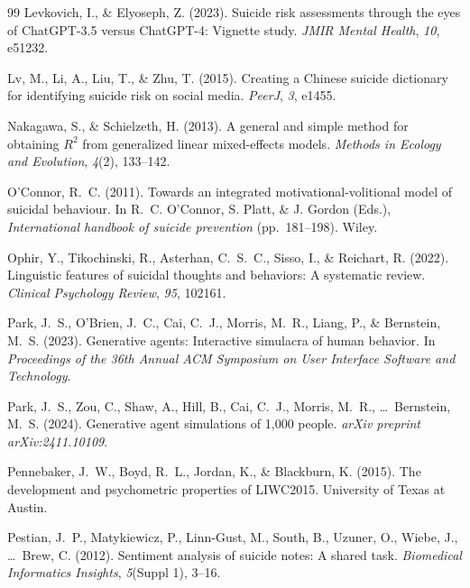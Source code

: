 \documentclass[review,12pt,authoryear]{elsarticle}
\begin{document}
\begin{thebibliography}{99}
Levkovich, I., \& Elyoseph, Z. (2023).
\newblock Suicide risk assessments through the eyes of {ChatGPT}-3.5 versus {ChatGPT}-4: {V}ignette study.
\newblock \textit{JMIR Mental Health}, \textit{10}, e51232.

Lv, M., Li, A., Liu, T., \& Zhu, T. (2015).
\newblock Creating a {C}hinese suicide dictionary for identifying suicide risk on social media.
\newblock \textit{PeerJ}, \textit{3}, e1455.

Nakagawa, S., \& Schielzeth, H. (2013).
\newblock A general and simple method for obtaining $R^2$ from generalized linear mixed-effects models.
\newblock \textit{Methods in Ecology and Evolution}, \textit{4}(2), 133--142.

O'Connor, R.~C. (2011).
\newblock Towards an integrated motivational-volitional model of suicidal behaviour.
\newblock In R.~C. O'Connor, S. Platt, \& J. Gordon (Eds.), \textit{International handbook of suicide prevention} (pp.\ 181--198). Wiley.

Ophir, Y., Tikochinski, R., Asterhan, C.~S.~C., Sisso, I., \& Reichart, R. (2022).
\newblock Linguistic features of suicidal thoughts and behaviors: {A} systematic review.
\newblock \textit{Clinical Psychology Review}, \textit{95}, 102161.

Park, J.~S., O'Brien, J.~C., Cai, C.~J., Morris, M.~R., Liang, P., \& Bernstein, M.~S. (2023).
\newblock Generative agents: {I}nteractive simulacra of human behavior.
\newblock In \textit{Proceedings of the 36th Annual ACM Symposium on User Interface Software and Technology}.

Park, J.~S., Zou, C., Shaw, A., Hill, B., Cai, C.~J., Morris, M.~R., \ldots\ Bernstein, M.~S. (2024).
\newblock Generative agent simulations of 1,000 people.
\newblock \textit{arXiv preprint arXiv:2411.10109}.

Pennebaker, J.~W., Boyd, R.~L., Jordan, K., \& Blackburn, K. (2015).
\newblock The development and psychometric properties of {LIWC2015}.
\newblock University of Texas at Austin.

Pestian, J.~P., Matykiewicz, P., Linn-Gust, M., South, B., Uzuner, O., Wiebe, J., \ldots\ Brew, C. (2012).
\newblock Sentiment analysis of suicide notes: {A} shared task.
\newblock \textit{Biomedical Informatics Insights}, \textit{5}(Suppl 1), 3--16.


\end{thebibliography}
\end{document}
